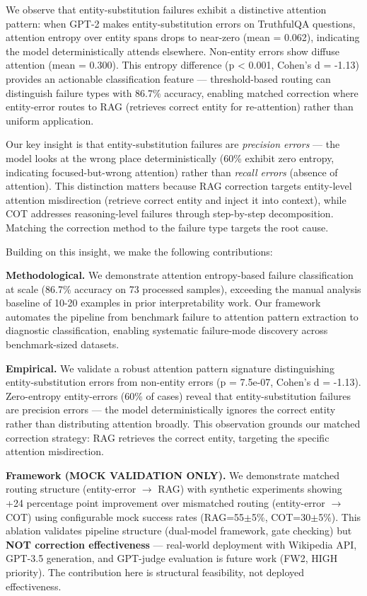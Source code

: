 We observe that entity-substitution failures exhibit a distinctive attention pattern: when GPT-2 makes entity-substitution errors on TruthfulQA questions, attention entropy over entity spans drops to near-zero (mean = 0.062), indicating the model deterministically attends elsewhere. Non-entity errors show diffuse attention (mean = 0.300). This entropy difference (p < 0.001, Cohen's d = -1.13) provides an actionable classification feature --- threshold-based routing can distinguish failure types with 86.7\% accuracy, enabling matched correction where entity-error routes to RAG (retrieves correct entity for re-attention) rather than uniform application.

Our key insight is that entity-substitution failures are \textit{precision errors} --- the model looks at the wrong place deterministically (60\% exhibit zero entropy, indicating focused-but-wrong attention) rather than \textit{recall errors} (absence of attention). This distinction matters because RAG correction targets entity-level attention misdirection (retrieve correct entity and inject it into context), while COT addresses reasoning-level failures through step-by-step decomposition. Matching the correction method to the failure type targets the root cause.

Building on this insight, we make the following contributions:

\textbf{Methodological.} We demonstrate attention entropy-based failure classification at scale (86.7\% accuracy on 73 processed samples), exceeding the manual analysis baseline of 10-20 examples in prior interpretability work. Our framework automates the pipeline from benchmark failure to attention pattern extraction to diagnostic classification, enabling systematic failure-mode discovery across benchmark-sized datasets.

\textbf{Empirical.} We validate a robust attention pattern signature distinguishing entity-substitution errors from non-entity errors (p = 7.5e-07, Cohen's d = -1.13). Zero-entropy entity-errors (60\% of cases) reveal that entity-substitution failures are precision errors --- the model deterministically ignores the correct entity rather than distributing attention broadly. This observation grounds our matched correction strategy: RAG retrieves the correct entity, targeting the specific attention misdirection.

\textbf{Framework (MOCK VALIDATION ONLY).} We demonstrate matched routing structure (entity-error $\to$ RAG) with synthetic experiments showing +24 percentage point improvement over mismatched routing (entity-error $\to$ COT) using configurable mock success rates (RAG=55$\pm$5\%, COT=30$\pm$5\%). This ablation validates pipeline structure (dual-model framework, gate checking) but \textbf{NOT correction effectiveness} --- real-world deployment with Wikipedia API, GPT-3.5 generation, and GPT-judge evaluation is future work (FW2, HIGH priority). The contribution here is structural feasibility, not deployed effectiveness.

